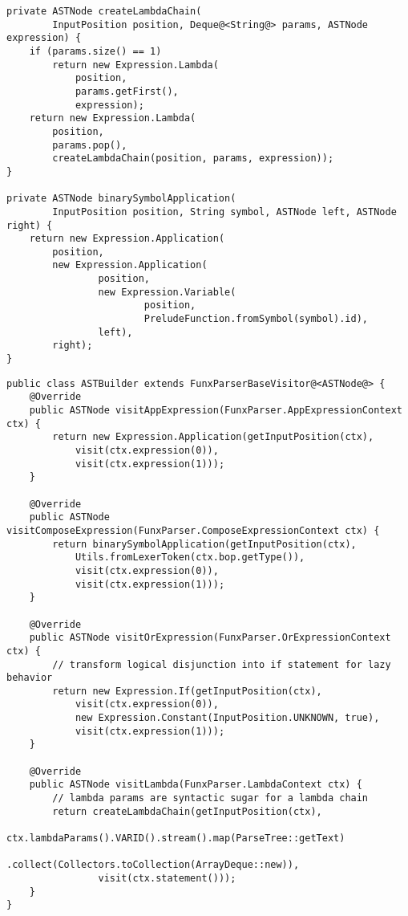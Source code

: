 \begin{lstlisting}[caption={Metodi per astrazioni annidate e operatori simbolici binari}, style=javaCode, label={lst:5-6-auxiliary-methods-java}]
private ASTNode createLambdaChain(
        InputPosition position, Deque@<String@> params, ASTNode expression) {
    if (params.size() == 1)
        return new Expression.Lambda(
            position,
            params.getFirst(),
            expression);
    return new Expression.Lambda(
        position,
        params.pop(),
        createLambdaChain(position, params, expression));
}

private ASTNode binarySymbolApplication(
        InputPosition position, String symbol, ASTNode left, ASTNode right) {
    return new Expression.Application(
        position,
        new Expression.Application(
                position,
                new Expression.Variable(
                        position,
                        PreludeFunction.fromSymbol(symbol).id),
                left),
        right);
}
\end{lstlisting}
\vspace{4mm}
\begin{lstlisting}[caption={Alcuni metodi \texttt{visit} di \texttt{ASTBuilder}}, style=javaCode, label={lst:5-6-astbuilder-java}]
public class ASTBuilder extends FunxParserBaseVisitor@<ASTNode@> {
    @Override
    public ASTNode visitAppExpression(FunxParser.AppExpressionContext ctx) {
        return new Expression.Application(getInputPosition(ctx),
            visit(ctx.expression(0)),
            visit(ctx.expression(1)));
    }

    @Override
    public ASTNode visitComposeExpression(FunxParser.ComposeExpressionContext ctx) {
        return binarySymbolApplication(getInputPosition(ctx),
            Utils.fromLexerToken(ctx.bop.getType()),
            visit(ctx.expression(0)),
            visit(ctx.expression(1)));
    }
    
    @Override
    public ASTNode visitOrExpression(FunxParser.OrExpressionContext ctx) {
        // transform logical disjunction into if statement for lazy behavior
        return new Expression.If(getInputPosition(ctx),
            visit(ctx.expression(0)),
            new Expression.Constant(InputPosition.UNKNOWN, true),
            visit(ctx.expression(1)));
    }

    @Override
    public ASTNode visitLambda(FunxParser.LambdaContext ctx) {
        // lambda params are syntactic sugar for a lambda chain
        return createLambdaChain(getInputPosition(ctx),
            ctx.lambdaParams().VARID().stream().map(ParseTree::getText)
                    .collect(Collectors.toCollection(ArrayDeque::new)),
                visit(ctx.statement()));
    }
}    
\end{lstlisting}

